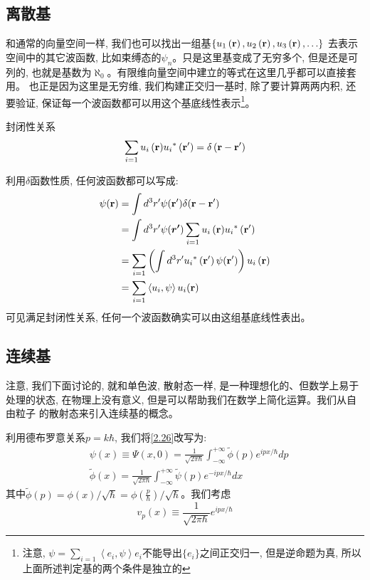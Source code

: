 \subsection*{离散基}
和通常的向量空间一样, 我们也可以找出一组基$\{{u_1}\left( {\bf{r}} \right),{u_2}\left( {\bf{r}} \right),{u_3}\left( {\bf{r}} \right),\ldots\}$
去表示空间中的其它波函数, 比如束缚态的$\psi_n$。只是这里基变成了无穷多个, 但是还是可列的, 也就是基数为${\aleph _0}$。有限维向量空间中建立的等式在这里几乎都可以直接套用。
也正是因为这里是无穷维, 我们构建正交归一基时, 除了要计算两两内积, 还要验证, 保证每一个波函数都可以用这个基底线性表示\footnote[1]{注意, $\psi=\sum\limits_{i = 1}\left\langle{e_i,\psi}\right\rangle e_i$不能导出$\{e_i\}$之间正交归一, 但是逆命题为真, 所以上面所述判定基的两个条件是独立的}。
\begin{proposition}{封闭性关系}
    \begin{equation}
        \sum\limits_{i = 1}{{u_i}\left( {\bf{r}} \right)} {u_i}^*\left( {\bf{r^\prime}} \right) = \delta \left( {{\bf{r}} - {\bf{r^\prime}}} \right)
    \end{equation}
\end{proposition}
\begin{thinknote}
    利用$\delta$函数性质, 任何波函数都可以写成:
    \begin{align*}
        \psi(\bf{r}) & = \int d^3r^\prime \psi(\bf{r^\prime})\delta({\bf{r}-\bf{r^\prime}})\\ 
        & = \int d^3r^\prime \psi(\bm{r^\prime})\sum\limits_{i = 1}{{u_i}\left( {\bf{r}} \right)} {u_i}^*\left( {\bf{r^\prime}} \right)\\
        &=\sum\limits_{i = 1}\left(\int d^3r^\prime {u_i}^*\left( {\bf{r^\prime}} \right) \psi(\bf{r^\prime})\right){{u_i}\left( {\bf{r}} \right)}\\
        &=\sum\limits_{i = 1}\left\langle{u_i,\psi}\right\rangle u_i(\bf{r})
    \end{align*}
    可见满足封闭性关系, 任何一个波函数确实可以由这组基底线性表出。
\end{thinknote}
\subsection*{连续基}
注意, 我们下面讨论的, 就和单色波, 散射态一样, 是一种理想化的、但数学上易于处理的状态, 在物理上没有意义, 但是可以帮助我们在数学上简化运算。我们从自由粒子
的散射态来引入连续基的概念。

利用德布罗意关系$p=k\hbar$, 我们将\ref{2.26}改写为:
\begin{align}
    &\psi(x)\equiv\Psi(x,0)=\frac{1}{\sqrt{2\pi\hbar}}\int_{-\infty}^{+\infty}\tilde{\phi}(p)e^{ipx/\hbar}dp\\
    &\tilde{\phi}(x)=\frac{1}{\sqrt{2\pi\hbar}}\int_{-\infty}^{+\infty}\tilde{\psi}(p)e^{-ipx/\hbar}dx
\end{align}
其中$\tilde{\phi}(p)=\phi(x)/\sqrt{\hbar}=\phi(\frac{p}{\hbar})/\sqrt{\hbar}$。我们考虑$$v_p(x)\equiv\frac{1}{\sqrt{2\pi\hbar}}e^{ipx/\hbar}$$

